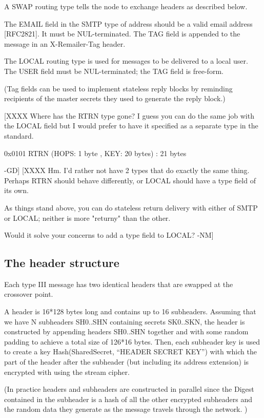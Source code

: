 A SWAP routing type tells the node to exchange headers as described below.

The EMAIL field in the SMTP type of address should be a valid email
address [RFC2821].  It must be NUL-terminated.  The TAG field is
appended to the message in an X-Remailer-Tag header.

The LOCAL routing type is used for messages to be delivered to a local
user.  The USER field must be NUL-terminated; the TAG field is
free-form.

(Tag fields can be used to implement stateless reply blocks by
reminding recipients of the master secrets they used to generate the
reply block.)

[XXXX Where has the RTRN type gone? I guess you can do the same job
with the LOCAL field but I would prefer to have it specified as a
separate type in the standard. 

0x0101 RTRN  (HOPS: 1 byte , KEY: 20 bytes) : 21 bytes

-GD]
[XXXX Hm.  I'd rather not have 2 types that do exactly the same thing.
      Perhaps RTRN should behave differently, or LOCAL should have a
      type field of its own.

      As things stand above, you can do stateless return delivery with
      either of SMTP or LOCAL; neither is more "returny" than the other.

      Would it solve your concerns to add a type field to LOCAL? -NM]
 
\subsection{The header structure}

Each type III message has two identical headers that are swapped at
the crossover point.

A header is 16*128 bytes long and contains up to 16
subheaders. Assuming that we have N subheaders SH0..SHN containing
secrets SK0..SKN, the header is constructed by appending headers
SH0..SHN together and with some random padding to achieve a total size
of 126*16 bytes. Then, each subheader key is used to create a key
Hash(SharedSecret, ``HEADER SECRET KEY'') with which the part of the
header after the subheader (but including its address extension) is
encrypted with using the stream cipher. 

(In practice headers and subheaders are constructed in parallel since
the Digest contained in the subheader is a hash of all the other
encrypted subheaders and the random data they generate as the message
travels through the network. )

